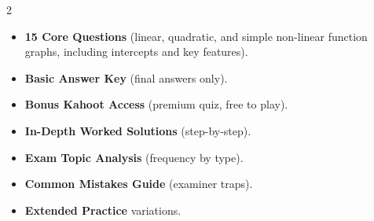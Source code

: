 \documentclass[11pt,a4paper]{article}
\newcommand{\FullReleaseDate}{April 30, 2026}
\begin{document}
\vspace{8pt}

\begin{multicols}{2}
  \begin{tcolorbox}[card, title=\sffamily\bfseries\textcolor{white}{\faHandPointDown\ TODAY (Simplified Version)}, colbacktitle=mainblue, boxed title style={sharp corners, boxrule=0pt}]
    \begin{itemize}[leftmargin=1.2em, itemsep=2pt]
      \item \small \textbf{15 Core Questions} (linear, quadratic, and simple non-linear function graphs, including intercepts and key features).
      \item \small \textbf{Basic Answer Key} (final answers only).
      \item \small \textbf{Bonus Kahoot Access} (premium quiz, free to play).
    \end{itemize}
  \end{tcolorbox}

  \columnbreak

  \begin{tcolorbox}[card, title=\sffamily\bfseries\textcolor{white}{\faRocket\ ON \FullReleaseDate\ (Full Upgrade)}, colbacktitle=mainblue, boxed title style={sharp corners, boxrule=0pt}]
    \begin{itemize}[leftmargin=1.2em, itemsep=2pt]
      \item \small \textbf{In-Depth Worked Solutions} (step-by-step).
      \item \small \textbf{Exam Topic Analysis} (frequency by type).
      \item \small \textbf{Common Mistakes Guide} (examiner traps).
      \item \small \textbf{Extended Practice} variations.
    \end{itemize}
  \end{tcolorbox}
\end{multicols}
\end{document}
